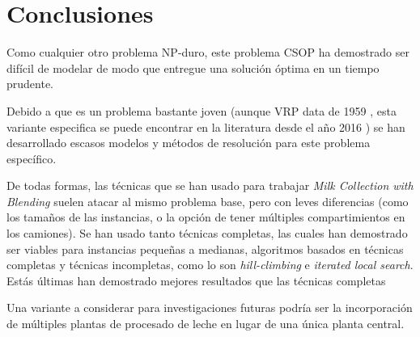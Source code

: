 \section{Conclusiones}

Como cualquier otro problema NP-duro, este problema CSOP ha demostrado ser difícil de modelar de modo que entregue una solución óptima en un tiempo prudente.

Debido a que es un problema bastante joven (aunque VRP data de 1959 \cite{TruckDispatchingProblem}, esta variante especifica se puede encontrar en la literatura desde el año 2016 \cite{MilkWithBlending}) se han desarrollado escasos modelos y métodos de resolución para este problema específico.

De todas formas, las técnicas que se han usado para trabajar \textit{Milk Collection with Blending} suelen atacar al mismo problema base, pero con leves diferencias (como los tamaños de las instancias, o la opción de tener múltiples compartimientos en los camiones). Se han usado tanto técnicas completas, las cuales han demostrado ser viables para instancias pequeñas a medianas, algoritmos basados en técnicas completas y técnicas incompletas, como lo son \textit{hill-climbing} e \textit{iterated local search}. Estás últimas han demostrado mejores resultados que las técnicas completas

Una variante a considerar para investigaciones futuras podría ser la incorporación de múltiples plantas de procesado de leche en lugar de una única planta central.
